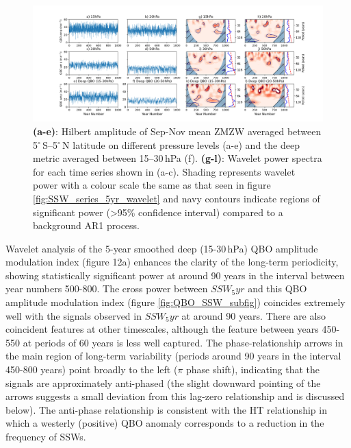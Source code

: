 
\begin{figure}[h!]
    \begin{center}
    \includegraphics[width = \linewidth]{Figures/Figures-origins/QBO_levels_amp.png}
    \caption[QBO amplitude timeseries and associated wavelet power spectra at different levels in UKESM]{\textbf{(a-e)}: Hilbert amplitude of Sep-Nov mean ZMZW averaged between 5$^\circ$\,S--5$^\circ$\,N latitude on different pressure levels (a-e) and the deep metric averaged between 15--30\,hPa (f). \textbf{(g-l)}: Wavelet power spectra for each time series shown in (a-c). Shading represents wavelet power with a colour scale the same as that seen in figure \ref{fig:SSW_series_5yr_wavelet} and navy contours indicate regions of significant power (>95\% confidence interval) compared to a background AR1 process.}
    \label{fig:QBO_levs_amp}
    \end{center}
\end{figure}


Wavelet analysis of the 5-year smoothed deep (15-30\,hPa) QBO amplitude modulation index (figure 12a) enhances the clarity of the long-term periodicity, showing statistically significant power at around 90 years in the interval between year numbers 500-800. The cross power between $SSW_5yr$ and this QBO amplitude modulation index (figure \ref{fig:QBO_SSW_subfig}) coincides extremely well with the signals observed in $SSW_5yr$ at around 90 years. There are also coincident features at other timescales, although the feature between years 450-550 at periods of 60 years is less well captured. The phase-relationship arrows in the main region of long-term variability (periods around 90 years in the interval 450-800 years) point broadly to the left ($\pi$ phase shift), indicating that the signals are approximately anti-phased (the slight downward pointing of the arrows suggests a small deviation from this lag-zero relationship and is discussed below). The anti-phase relationship is consistent with the HT relationship in which a westerly (positive) QBO anomaly corresponds to a reduction in the frequency of SSWs.

